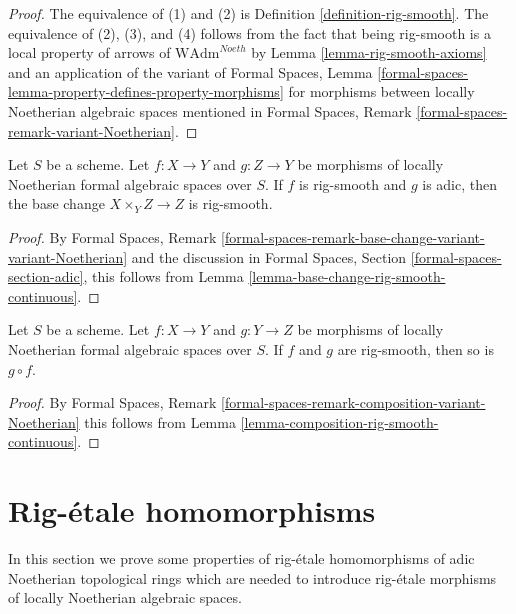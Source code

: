 \begin{proof}
The equivalence of (1) and (2) is Definition \ref{definition-rig-smooth}.
The equivalence of (2), (3), and (4) follows from the fact that
being rig-smooth is a local property of arrows of
$\text{WAdm}^{Noeth}$ by Lemma \ref{lemma-rig-smooth-axioms}
and an application of the variant of
Formal Spaces, Lemma
\ref{formal-spaces-lemma-property-defines-property-morphisms}
for morphisms between locally Noetherian algebraic spaces
mentioned in
Formal Spaces, Remark
\ref{formal-spaces-remark-variant-Noetherian}.
\end{proof}

\begin{lemma}
\label{lemma-base-change-rig-smooth}
Let $S$ be a scheme. Let $f : X \to Y$ and $g : Z \to Y$
be morphisms of locally Noetherian formal algebraic spaces over $S$.
If $f$ is rig-smooth and $g$ is adic, then the base change
$X \times_Y Z \to Z$ is rig-smooth.
\end{lemma}

\begin{proof}
By Formal Spaces, Remark
\ref{formal-spaces-remark-base-change-variant-variant-Noetherian}
and the discussion in Formal Spaces, Section
\ref{formal-spaces-section-adic},
this follows from Lemma \ref{lemma-base-change-rig-smooth-continuous}.
\end{proof}

\begin{lemma}
\label{lemma-composition-rig-smooth}
Let $S$ be a scheme. Let $f : X \to Y$ and $g : Y \to Z$
be morphisms of locally Noetherian formal algebraic spaces over $S$.
If $f$ and $g$ are rig-smooth, then so is $g \circ f$.
\end{lemma}

\begin{proof}
By Formal Spaces, Remark
\ref{formal-spaces-remark-composition-variant-Noetherian}
this follows from Lemma \ref{lemma-composition-rig-smooth-continuous}.
\end{proof}










\section{Rig-\'etale homomorphisms}
\label{section-rig-etale-homomorphisms}

\noindent
In this section we prove some properties of rig-\'etale homomorphisms
of adic Noetherian topological rings which are needed to introduce
rig-\'etale morphisms of locally Noetherian algebraic spaces.

